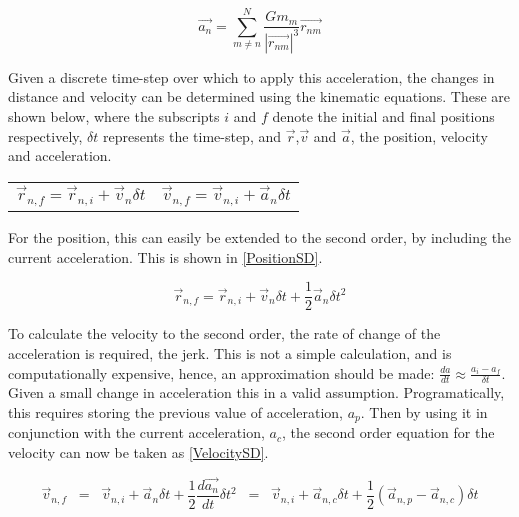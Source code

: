 \documentclass[a4paper,10pt]{article}
\begin{document}
\begin{equation} \label{Sum_a}
    \vec{a_n} =  \sum\limits_{m\neq n}^{N} \frac{G m_m}{\left|\vec{r_{nm}}\right|^3}\vec{r_{nm}}
\end{equation}

Given a discrete time-step over which to apply this acceleration, the changes in distance and velocity can be determined using the kinematic equations. These are shown below, where the subscripts $i$ and $f$ denote the initial and final positions respectively, $\delta t$ represents the time-step, and $\vec r$,$\vec v$ and $\vec a$, the position, velocity and acceleration. %

\noindent\begin{tabularx}{\textwidth}{@{}XX@{}}
  \begin{equation*}
   \vec{r}_{n,f} =  \vec{r}_{n,i} + \vec{v}_{n} \delta t
    \label{PositionFD}
  \end{equation*} &
  \begin{equation*}
 \vec{v}_{n,f} =  \vec{v}_{n,i} + \vec{a}_{n} \delta t
    \label{VelocityFD}
  \end{equation*}
\end{tabularx}

For the position, this can easily be extended to the second order, by including the current acceleration. This is shown in \cref{PositionSD}.

\begin{equation} \label{PositionSD}
    \vec{r}_{n,f} =  \vec{r}_{n,i} + \vec{v}_{n} \delta t + \frac{1}{2}\vec{a}_{n}\delta t^2
\end{equation}

To calculate the velocity to the second order, the rate of change of the acceleration is required, the jerk. This is not a simple calculation, and is computationally expensive, hence, an approximation should be made: $\frac{da}{dt} \approx \frac{a_i - a_f}{\delta t}$. Given a small change in acceleration this in a valid assumption. Programatically, this requires storing the previous value of acceleration, $a_p$. Then by using it in conjunction with the current acceleration, $a_c$, the second order equation for the velocity can now be taken as \cref{VelocitySD}.

\begin{equation} \label{VelocitySD}
     \vec{v}_{n,f} \;\; =  \;\; \vec{v}_{n,i} + \vec{a}_{n} \delta t + \frac{1}{2}\frac{d\vec{a_n}}{dt}\delta t^2 \;\; = \;\; \vec{v}_{n,i} + \vec{a}_{n,c} \delta t + \frac{1}{2}(\vec{a}_{n,p} - \vec{a}_{n,c})\delta t
\end{equation}
\end{document}
